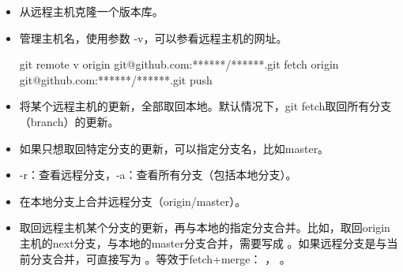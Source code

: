 \documentclass[letterpaper,10pt,english]{sphinxmanual}
\begin{document}
\label{\detokenize{git/02_remoteRep:id2}}\begin{itemize}
\item {} 
 从远程主机克隆一个版本库。

\item {} 
 管理主机名，使用参数 -v，可以参看远程主机的网址。

%
\begin{sphinxVerbatim}[commandchars=\\\{\},numbers=left,firstnumber=1,stepnumber=1]
\PYGZdl{} git remote \PYGZhy{}v
origin  git@github.com:******/******.git fetch
origin  git@github.com:******/******.git push
\end{sphinxVerbatim}

\item {} 
 将某个远程主机的更新，全部取回本地。默认情况下，git fetch取回所有分支（branch）的更新。

\item {} 
 如果只想取回特定分支的更新，可以指定分支名，比如master。

\item {} 
 -r：查看远程分支，-a：查看所有分支（包括本地分支）。

\item {} 
 在本地分支上合并远程分支（origin/master）。

\item {} 
 取回远程主机某个分支的更新，再与本地的指定分支合并。比如，取回origin主机的next分支，与本地的master分支合并，需要写成  。如果远程分支是与当前分支合并，可直接写为  。等效于fetch+merge：  ，  。

\end{itemize}
\end{document}
